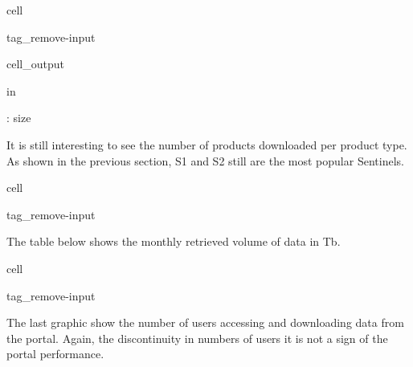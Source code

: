 \documentclass[letterpaper,10pt,english]{jupyterBook}
\begin{document}
\begin{sphinxuseclass}{cell}
\begin{sphinxuseclass}{tag_remove-input}
\begin{sphinxVerbatimOutput}
\begin{sphinxuseclass}{cell_output}
\begin{sphinxVerbatim}[commandchars=\\\{\}]
 in 
      
    
        
  
     
     
     
     

: \PYGZsq{}size\PYGZsq{}
\end{sphinxVerbatim}

\end{sphinxuseclass}\end{sphinxVerbatimOutput}

\end{sphinxuseclass}
\end{sphinxuseclass}
\sphinxAtStartPar
It is still interesting to see the number of products downloaded per product type. As shown in the previous section, S1 and S2 still are the most popular Sentinels.

\begin{sphinxuseclass}{cell}
\begin{sphinxuseclass}{tag_remove-input}
\end{sphinxuseclass}
\end{sphinxuseclass}
\sphinxAtStartPar
The table below shows the monthly retrieved volume of data in Tb.

\begin{sphinxuseclass}{cell}
\begin{sphinxuseclass}{tag_remove-input}
\end{sphinxuseclass}
\end{sphinxuseclass}
\sphinxAtStartPar
The last graphic show the number of users accessing and downloading data from the portal. Again, the discontinuity in numbers of users it is not a sign of the portal performance.
\end{document}
